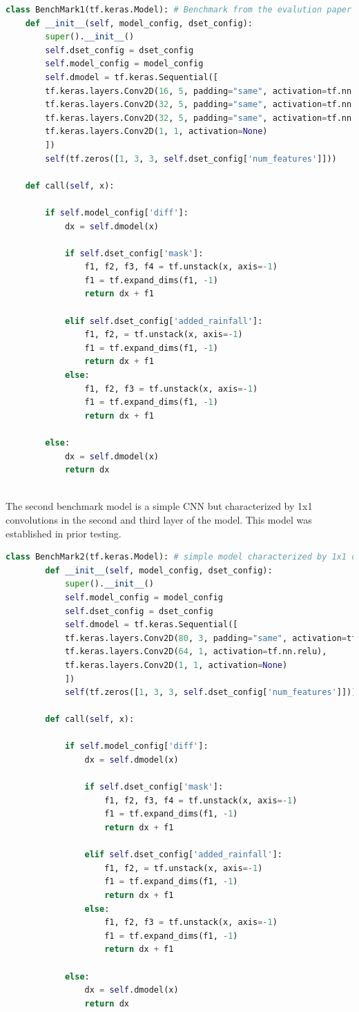 \begin{lstlisting}[language=Python, label={lst:6}]
class BenchMark1(tf.keras.Model): # Benchmark from the evalution paper (but reduced, do to computational constraints)
	def __init__(self, model_config, dset_config):
		super().__init__()
		self.dset_config = dset_config
		self.model_config = model_config
		self.dmodel = tf.keras.Sequential([
		tf.keras.layers.Conv2D(16, 5, padding="same", activation=tf.nn.relu),
		tf.keras.layers.Conv2D(32, 5, padding="same", activation=tf.nn.relu),
		tf.keras.layers.Conv2D(32, 5, padding="same", activation=tf.nn.relu),
		tf.keras.layers.Conv2D(1, 1, activation=None)
		])
		self(tf.zeros([1, 3, 3, self.dset_config['num_features']]))

	def call(self, x):
	
		if self.model_config['diff']:
			dx = self.dmodel(x)
			
			if self.dset_config['mask']:
				f1, f2, f3, f4 = tf.unstack(x, axis=-1)
				f1 = tf.expand_dims(f1, -1)
				return dx + f1
			
			elif self.dset_config['added_rainfall']:
				f1, f2, = tf.unstack(x, axis=-1)
				f1 = tf.expand_dims(f1, -1)
				return dx + f1
			else:
				f1, f2, f3 = tf.unstack(x, axis=-1)
				f1 = tf.expand_dims(f1, -1)
				return dx + f1
		
		else:
			dx = self.dmodel(x)
			return dx
	
\end{lstlisting}

The second benchmark model is a simple CNN but characterized by 1x1 convolutions in the second and third layer of the model. This model was established in prior testing.

\begin{lstlisting}[language=Python, label={lst:7}]
	class BenchMark2(tf.keras.Model): # simple model characterized by 1x1 convolutions
		def __init__(self, model_config, dset_config):
			super().__init__()
			self.model_config = model_config
			self.dset_config = dset_config
			self.dmodel = tf.keras.Sequential([
			tf.keras.layers.Conv2D(80, 3, padding="same", activation=tf.nn.relu),
			tf.keras.layers.Conv2D(64, 1, activation=tf.nn.relu),
			tf.keras.layers.Conv2D(1, 1, activation=None)
			])
			self(tf.zeros([1, 3, 3, self.dset_config['num_features']]))
		
		def call(self, x):
		
			if self.model_config['diff']:
				dx = self.dmodel(x)
				
				if self.dset_config['mask']:
					f1, f2, f3, f4 = tf.unstack(x, axis=-1)
					f1 = tf.expand_dims(f1, -1)
					return dx + f1
				
				elif self.dset_config['added_rainfall']:
					f1, f2, = tf.unstack(x, axis=-1)
					f1 = tf.expand_dims(f1, -1)
					return dx + f1
				else:
					f1, f2, f3 = tf.unstack(x, axis=-1)
					f1 = tf.expand_dims(f1, -1)
					return dx + f1
			
			else:
				dx = self.dmodel(x)
				return dx
\end{lstlisting}

